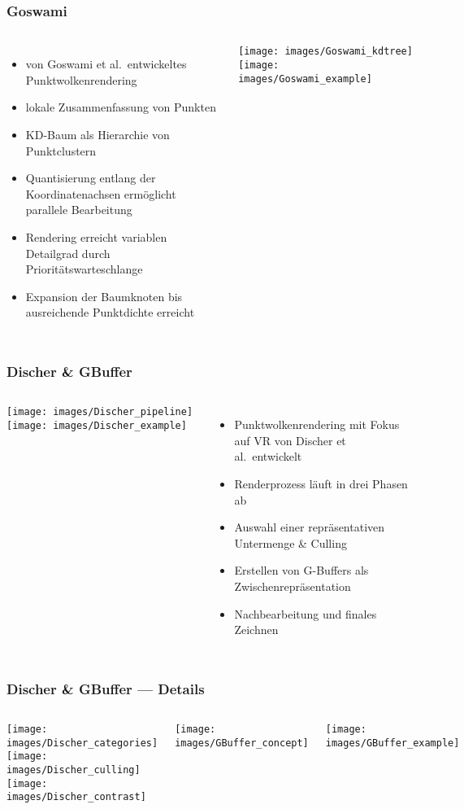 \documentclass[aspectratio=169]{beamer}
\begin{document}
\begin{frame}
    \frametitle{Goswami}
    \begin{columns}
        \begin{itemize}
            \item von Goswami et al.\ entwickeltes Punktwolkenrendering
            \item lokale Zusammenfassung von Punkten
            \item KD-Baum als Hierarchie von Punktclustern
            \item Quantisierung entlang der Koordinatenachsen ermöglicht parallele Bearbeitung
            \item Rendering erreicht variablen Detailgrad durch Prioritätswarteschlange
            \item Expansion der Baumknoten bis ausreichende Punktdichte erreicht
        \end{itemize}
    
    \texttt{[image: images/Goswami\_kdtree]}
    \texttt{[image: images/Goswami\_example]}
    \end{columns}
\end{frame}

\begin{frame}
    \frametitle{Discher \& GBuffer}
    \begin{columns}
    \texttt{[image: images/Discher\_pipeline]}
    \texttt{[image: images/Discher\_example]}

        \begin{itemize}
            \item Punktwolkenrendering mit Fokus auf VR von Discher et al.\ entwickelt
            \item Renderprozess läuft in drei Phasen ab
            \item Auswahl einer repräsentativen Untermenge \& Culling
            \item Erstellen von G-Buffers als Zwischenrepräsentation
            \item Nachbearbeitung und finales Zeichnen
        \end{itemize}
    \end{columns}
\end{frame}

\begin{frame}
    \frametitle{Discher \& GBuffer --- Details}
    \begin{columns}
        \texttt{[image: images/Discher\_categories]}
        \texttt{[image: images/Discher\_culling]}
        \texttt{[image: images/Discher\_contrast]}

        \texttt{[image: images/GBuffer\_concept]}

        \texttt{[image: images/GBuffer\_example]}
    \end{columns}
\end{frame}
\end{document}
